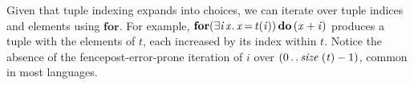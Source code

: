 \documentclass[acmsmall]{acmart}
\newcommand{\Varid}[1]{\mathit{#1}}
\begin{document}
Given that tuple indexing expands into choices, we can iterate over tuple indices and elements using \ensuremath{\textbf{for}}.
For example, \ensuremath{\textbf{for}(\exists\Varid{i}\hspace{0.1em}\Varid{x}.\,\Varid{x}\hspace{-0.14em}=\hspace{-0.14em}\Varid{t}(\Varid{i}))\,\textbf{do}\,(\Varid{x}\mathbin{+}\Varid{i})} produces a tuple with the elements of \ensuremath{\Varid{t}}, each increased by its index within \ensuremath{\Varid{t}}.  Notice the absence of the
fencepost-error-prone iteration of \ensuremath{\Varid{i}} over \ensuremath{(\mathrm{0}\mathinner{\ldotp\ldotp}\Varid{size}\;(\Varid{t})\mathbin{-}\mathrm{1})}, common in most languages.




\end{document}
